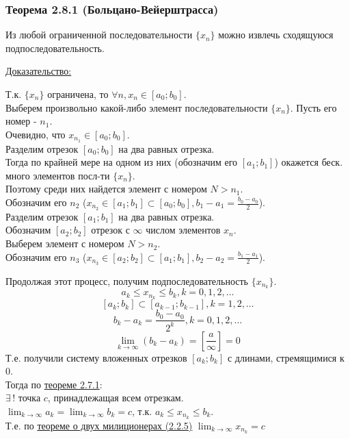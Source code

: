 \documentclass[12pt]{article}
\begin{document}
    \subsubsection*{Теорема 2.8.1 (Больцано-Вейерштрасса)}\label{th:2.8.1}
    \indent Из любой ограниченной последовательности $\{x_n\}$ можно извлечь сходящуюся подпоследовательность.\par\noindent
    \underline{Доказательство:}
    \begin{adjustwidth}{1.5em}{1.5em}
        Т.к. $\{x_n\}$ ограничена, то $\forall n, x_n \in [a_{0}; b_{0}]$.\\
        Выберем произвольно какой-либо элемент последовательности $\{x_n\}$. Пусть его номер - $n_{1}$.\\
        Очевидно, что $x_{n_{1}} \in [a_{0}; b_{0}]$.\\
        Разделим отрезок $[a_{0}; b_{0}]$ на два равных отрезка.\\
        Тогда по крайней мере на одном из них (обозначим его $[a_{1}; b_{1}]$) окажется беск. много элементов посл-ти $\{x_n\}$.\\
        Поэтому среди них найдется элемент с номером $N > n_{1}$.\\
        Обозначим его $n_{2}$ ($x_{n_{2}} \in [a_{1}; b_{1}] \subset [a_{0}; b_{0}], b_{1} - a_{1} = \frac{b_{0} - a_{0}}{2}$).\\
        Разделим отрезок $[a_{1}; b_{1}]$ на два равных отрезка.\\
        Обозначим $[a_{2}; b_{2}]$ отрезок с $\infty$ числом элементов $x_n$.\\
        Выберем элемент с номером $N > n_{2}$.\\
        Обозначим его $n_{3}$ ($x_{n_{3}} \in [a_{2}; b_{2}] \subset [a_{1}; b_{1}], b_{2} - a_{2} = \frac{b_{1} - a_{1}}{2}$).\par\noindent
        Продолжая этот процесс, получим подпоследовательность $\{x_{n_{k}}\}$.\\
        \[a_{k} \le x_{n_{k}} \le b_{k}, k = 0, 1, 2, \dots\]
        \[[a_{k}; b_{k}] \subset [a_{k-1}; b_{k-1}], k = 1, 2, \dots\]
        \[b_{k} - a_{k} = \frac{b_{0} - a_{0}}{2^{k}}, k = 0,1,2,\dots\]
        \[\lim_{k\to\infty}(b_{k}-a_{k}) = \left[\frac{a}{\infty}\right] = 0\]
        Т.е. получили систему вложенных отрезков $[a_{k}; b_{k}]$ с длинами, стремящимися к $0$.\\
        Тогда по \hyperref[th:2.7.1]{теореме 2.7.1}:\\
        \indent $\exists\,!$ точка $c$, принадлежащая всем отрезкам.\\
        \indent $\lim_{k\to\infty}a_{k} = \lim_{k\to\infty}b_{k} = c$, т.к. $a_{k} \le x_{n_{k}} \le b_{k}$.\\
        \indent Т.е. по \hyperref[th:2.2.5]{теореме о двух милиционерах (2.2.5)} $\lim_{k\to\infty}x_{n_{k}} = c$\\
    \end{adjustwidth}
\end{document}
